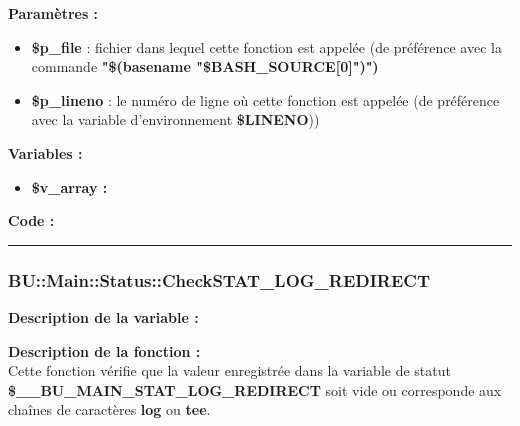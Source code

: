 \documentclass[a4paper,10pt]{article}
\begin{document}
\begin{justify}
    \textbf{Paramètres :}
    \begin{itemize}
        \item \color{orange}\textbf{\$p\_file}\color{white} : fichier dans lequel cette fonction est appelée (de préférence avec la commande \textbf{"\$(\color{gray}basename \color{white}"\color{orange}\$BASH\_SOURCE[0]\color{white}")")}\\

        \item \color{orange}\textbf{\$p\_lineno}\color{white} : le numéro de ligne où cette fonction est appelée (de préférence avec la variable d'environnement \textbf{\color{orange}\$LINENO}))
    \end{itemize}
\end{justify}

\begin{justify}
    \textbf{Variables :}

    \begin{itemize}
        \item \textbf{\color{orange}\$v\_array\color{white} :}
    \end{itemize}
\end{justify}

\begin{justify}
    \textbf{Code :}
\end{justify}



\color{blue}\par\noindent\rule{\textwidth}{0.4pt}\color{white}

\color{blue}
\subsubsection{\color{mauve}BU::Main::Status::CheckSTAT\_LOG\_REDIRECT}\color{white}

\begin{justify}
    \textbf{Description de la variable :}\\

\end{justify}

\begin{justify}
    \textbf{Description de la fonction :}\\
    Cette fonction vérifie que la valeur enregistrée dans la variable de statut \textbf{\color{orange}\$\_\_BU\_MAIN\_STAT\_LOG\_REDIRECT} soit vide ou corresponde aux chaînes de caractères \textbf{log} ou \textbf{tee}.
\end{justify}
\end{document}
